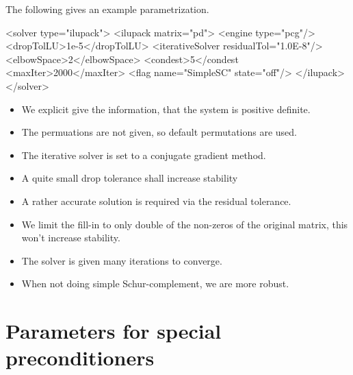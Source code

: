 The following gives an example parametrization. 
\begin{xmllisting}
<solver type="ilupack">
  <ilupack matrix="pd">
    <engine type="pcg"/>
    <dropTolLU>1e-5</dropTolLU>
    <iterativeSolver residualTol="1.0E-8"/>
    <elbowSpace>2</elbowSpace>
    <condest>5</condest
    <maxIter>2000</maxIter>
    <flag name="SimpleSC" state="off"/>
  </ilupack> 
</solver>
\end{xmllisting}
\begin{itemize}
\item We explicit give the information, that the system is positive definite.
\item The permuations are not given, so default permutations are used. 
\item The iterative solver is set to a conjugate gradient method.
\item A quite small drop tolerance shall increase stability
\item A rather accurate solution is required via the residual tolerance.
\item We limit the fill-in to only double of the non-zeros of the original
matrix, this won't increase stability.
\item The solver is given many iterations to converge.
\item When not doing simple Schur-complement, we are more robust.
\end{itemize}


\section{Parameters for special preconditioners}
%
%
